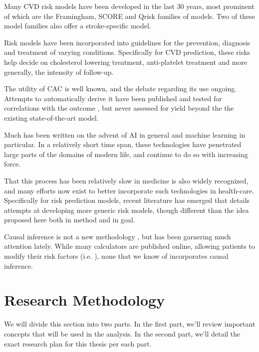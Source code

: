 \documentclass[a4paper,12pt]{article}
\begin{document}
	Many CVD risk models have been developed in the last 30 years, most prominent of which are the Framingham\cite{Wilson1998,NationalCholesterolEducationProgramNCEPExpertPanelonDetection2002,DAgostino2008,Goff2014}, SCORE\cite{Conroy2003} and Qrisk\cite{Hippisley-Cox2007,Hippisley-Cox2008} families of models.	Two of these model families also offer a stroke-specific model\cite{Wolf1991,DAgostino1994,Hippisley-Cox2013}.
	
	Risk models have been incorporated into guidelines for the prevention, diagnosis and treatment of varying conditions. Specifically for CVD prediction, these risks help decide on cholesterol lowering treatment, anti-platelet treatment and more generally, the intensity of follow-up\cite{NationalCholesterolEducationProgramNCEPExpertPanelonDetection2002,Graham2007,Goff2014,Bibbins-Domingo2016}.
	
	The utility of CAC is well known\cite{Erbel2010}, and the debate regarding its use ongoing\cite{Greenland2018}. Attempts to automatically derive it have been published \cite{Isgum2012,Shadmi2018} and tested for correlations with the outcome \cite{Takx2015}, but never assessed for yield beyond the the existing state-of-the-art model\cite{Force2018}.
	
	Much has been written on the advent of AI in general and machine learning in particular. In a relatively short time span, these technologies have penetrated large parts of the domains of modern life, and continue to do so with increasing force\cite{Ng2017}.
	
	That this process has been relatively slow in medicine is also widely recognized, and many efforts now exist to better incorporate such technologies in health-care\cite{Obermeyer2016}. Specifically for risk prediction models, recent literature has emerged that details attempts at developing more generic risk models, though different than the idea proposed here both in method and in goal\cite{Rajkomar2018}.
	
	Causal inference is not a new methodology \cite{GuidoW.Imbens2015,StephenL.Morgan2015}, but has been garnering much attention lately\cite{JudeaPearl2018}. While many calculators are published online, allowing patients to modify their risk factors (i.e. \cite{NHS2016}), none that we know of incorporates causal inference.
	
	\section{Research Methodology}
	We will divide this section into two parts. In the first part, we'll review important concepts that will be used in the analysis. In the second part, we'll detail the exact research plan for this thesis per each part.
	
\end{document}
